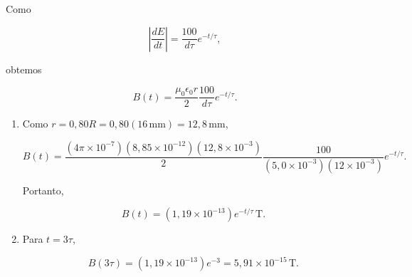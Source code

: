 Como

\[
\left|\frac{dE}{dt}\right|
=
\frac{100}{d\tau}e^{-t/\tau},
\]

obtemos

\[
B(t)=
\frac{\mu_0\epsilon_0 r}{2}
\frac{100}{d\tau}e^{-t/\tau}.
\]

\begin{enumerate}
    \item[(a)] Como \(r=0{,}80R=0{,}80(16\,\text{mm})=12{,}8\,\text{mm}\),

    \[
    B(t)=
    \frac{(4\pi\times 10^{-7})(8{,}85\times 10^{-12})
    (12{,}8\times 10^{-3})}{2}
    \frac{100}{(5{,}0\times 10^{-3})(12\times 10^{-3})}
    e^{-t/\tau}.
    \]

    Portanto,

    \[
    B(t)=
    (1{,}19\times 10^{-13})e^{-t/\tau}\,\text{T}.
    \]

    \item[(b)] Para \(t=3\tau\),

    \[
    B(3\tau)=
    (1{,}19\times 10^{-13})e^{-3}
    =
    5{,}91\times 10^{-15}\,\text{T}.
    \]
\end{enumerate}

\vspace{1cm}
